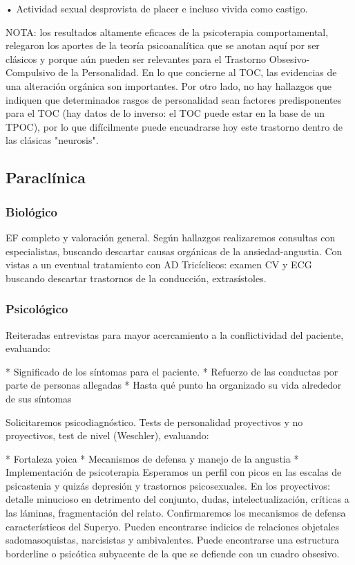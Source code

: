 • Actividad sexual desprovista de placer e incluso vivida como castigo.

NOTA: los resultados altamente eficaces de la psicoterapia comportamental, relegaron los aportes de la teoría psicoanalítica que se anotan aquí por ser clásicos y porque aún pueden ser relevantes para el Trastorno Obsesivo-Compulsivo de la Personalidad. En lo que concierne al TOC, las evidencias de una alteración orgánica son importantes. Por otro lado, no hay hallazgos que indiquen que determinados rasgos de personalidad sean factores predisponentes para el TOC (hay datos de lo inverso: el TOC puede estar en la base de un TPOC), por lo que difícilmente puede encuadrarse hoy este trastorno dentro de las clásicas "neurosis".

\subsection*{Paraclínica}
\subsubsection*{Biológico}
EF completo y valoración general. Según hallazgos realizaremos consultas con especialistas, buscando descartar causas orgánicas de la ansiedad-angustia. Con vistas a un eventual tratamiento con AD Tricíclicos: examen CV y ECG buscando descartar trastornos de la conducción, extrasístoles.
\subsubsection*{Psicológico}
Reiteradas entrevistas para mayor acercamiento a la conflictividad del paciente, evaluando:

* Significado de los síntomas para el paciente.
* Refuerzo de las conductas por parte de personas allegadas
* Hasta qué punto ha organizado su vida alrededor de sus síntomas

Solicitaremos psicodiagnóstico. Tests de personalidad proyectivos y no proyectivos, test de nivel (Weschler), evaluando:

* Fortaleza yoica
* Mecanismos de defensa y manejo de la angustia
* Implementación de psicoterapia Esperamos un perfil con picos en las escalas de psicastenia y quizás depresión y trastornos psicosexuales. En los proyectivos: detalle minucioso en detrimento del conjunto, dudas, intelectualización, críticas a las láminas, fragmentación del relato. Confirmaremos los mecanismos de defensa característicos del Superyo. Pueden encontrarse indicios de relaciones objetales sadomasoquistas, narcisistas y ambivalentes. Puede encontrarse una estructura borderline o psicótica subyacente de la que se defiende con un cuadro obsesivo.
